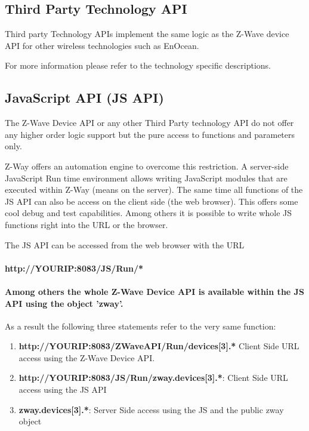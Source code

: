 \subsection{Third Party Technology API}

Third party Technology APIs implement the same logic as the Z-Wave device API for other 
wireless technologies such as EnOcean.

For more information  please refer to the technology specific descriptions.

\subsection{JavaScript API (JS API)}

The Z-Wave Device API or any other Third Party technology API do 
not offer any higher order logic support but the pure access to functions and parameters 
only.

Z-Way offers an automation engine to overcome this restriction. A server-side JavaScript
Run time environment allows writing JavaScript modules that are executed within Z-Way 
(means on the server). The same time all functions of the JS API can also be access on 
the client side (the web browser). This offers some cool debug and test capabilities. 
Among others it is possible to write whole JS functions right into the URL or the browser.

The JS API can be accessed from the web browser with the URL

\paragraph{http://YOURIP:8083/JS/Run/*}


\paragraph{Among others the whole Z-Wave Device API is available within the JS API using 
the object 'zway'.} As a result the following three statements refer to the 
very same function:

\begin{enumerate}
\item \textbf{http://YOURIP:8083/ZWaveAPI/Run/devices[3].*} Client Side URL access using 
the Z-Wave Device API.
\item \textbf{http://YOURIP:8083/JS/Run/zway.devices[3].*}: Client Side URL access 
using the JS API
\item \textbf{zway.devices[3].*}: Server Side access using the JS and the public zway object
\end{enumerate}

